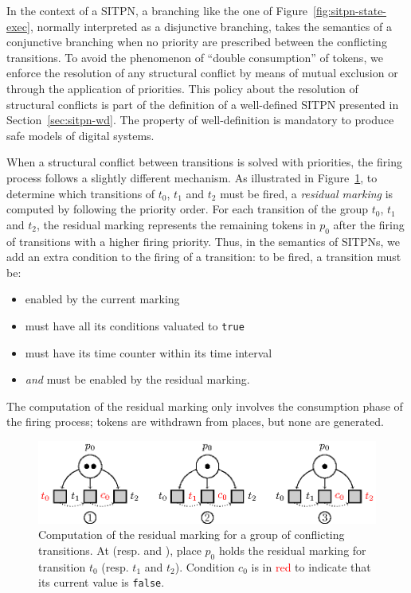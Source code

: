 \documentclass[pdflatex,sn-mathphys]{sn-jnl}%
\theoremstyle{thmstyleone}%
\theoremstyle{thmstyletwo}%
\theoremstyle{thmstylethree}%
\begin{document}
In the context of a SITPN, a branching like the one of
Figure~\ref{fig:sitpn-state-exec}, normally interpreted as a
disjunctive branching, takes the semantics of a conjunctive branching
when no priority are prescribed between the conflicting
transitions. To avoid the phenomenon of ``double consumption'' of
tokens, we enforce the resolution of any structural conflict by means
of mutual exclusion or through the application of priorities. This
policy about the resolution of structural conflicts is part of the
definition of a well-defined SITPN presented in
Section~\ref{sec:sitpn-wd}. The property of well-definition is
mandatory to produce safe models of digital systems.

When a structural conflict between transitions is solved with
priorities, the firing process follows a slightly different
mechanism. As illustrated in Figure~\ref{fig:resid-marking}, to
determine which transitions of $t_0$, $t_1$ and $t_2$ must be fired, a
\emph{residual marking} is computed by following the priority
order. For each transition of the group $t_0$, $t_1$ and $t_2$, the
residual marking represents the remaining tokens in $p_0$ after the
firing of transitions with a higher firing priority. Thus, in the
semantics of SITPNs, we add an extra condition to the firing of a
transition: to be fired, a transition must be:

\begin{itemize}[label=--]
\item enabled by the current marking
\item must have all its conditions valuated to \texttt{true}
\item must have its time counter within its time interval
\item \emph{and} must be enabled by the residual marking.
\end{itemize}

The computation of the residual marking only involves the consumption
phase of the firing process; tokens are withdrawn from places, but
none are generated.

\begin{figure}[H]
  \centering
  \includegraphics[keepaspectratio=true, width=.9\textwidth]{resid-marking.eps}
  \caption[Computation of the residual marking of a group of
  conflicting transitions.]{Computation of the residual marking for a
    group of conflicting transitions. At 
    (resp.  and ), place $p_0$ holds the
    residual marking for transition $t_0$ (resp. $t_1$ and
    $t_2$). Condition $c_0$ is in \textcolor{red}{red} to indicate
    that its current value is \texttt{false}.}
  \label{fig:resid-marking}
\end{figure}
\end{document}
